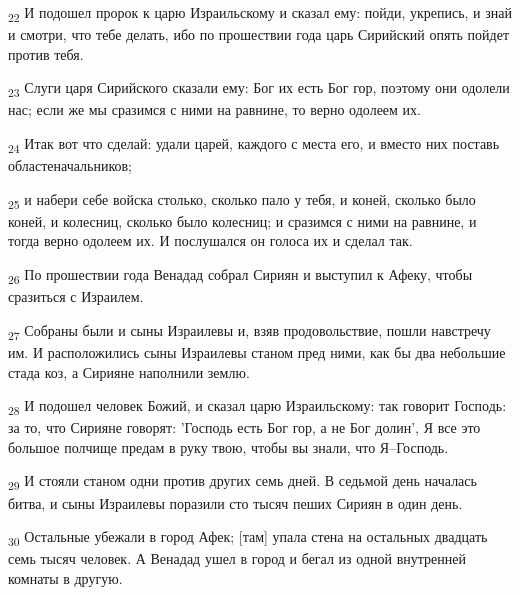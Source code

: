 \begin{tcolorbox}
\textsubscript{22} И подошел пророк к царю Израильскому и сказал ему: пойди, укрепись, и знай и смотри, что тебе делать, ибо по прошествии года царь Сирийский опять пойдет против тебя.
\end{tcolorbox}
\begin{tcolorbox}
\textsubscript{23} Слуги царя Сирийского сказали ему: Бог их есть Бог гор, поэтому они одолели нас; если же мы сразимся с ними на равнине, то верно одолеем их.
\end{tcolorbox}
\begin{tcolorbox}
\textsubscript{24} Итак вот что сделай: удали царей, каждого с места его, и вместо них поставь областеначальников;
\end{tcolorbox}
\begin{tcolorbox}
\textsubscript{25} и набери себе войска столько, сколько пало у тебя, и коней, сколько было коней, и колесниц, сколько было колесниц; и сразимся с ними на равнине, и тогда верно одолеем их. И послушался он голоса их и сделал так.
\end{tcolorbox}
\begin{tcolorbox}
\textsubscript{26} По прошествии года Венадад собрал Сириян и выступил к Афеку, чтобы сразиться с Израилем.
\end{tcolorbox}
\begin{tcolorbox}
\textsubscript{27} Собраны были и сыны Израилевы и, взяв продовольствие, пошли навстречу им. И расположились сыны Израилевы станом пред ними, как бы два небольшие стада коз, а Сирияне наполнили землю.
\end{tcolorbox}
\begin{tcolorbox}
\textsubscript{28} И подошел человек Божий, и сказал царю Израильскому: так говорит Господь: за то, что Сирияне говорят: 'Господь есть Бог гор, а не Бог долин', Я все это большое полчище предам в руку твою, чтобы вы знали, что Я--Господь.
\end{tcolorbox}
\begin{tcolorbox}
\textsubscript{29} И стояли станом одни против других семь дней. В седьмой день началась битва, и сыны Израилевы поразили сто тысяч пеших Сириян в один день.
\end{tcolorbox}
\begin{tcolorbox}
\textsubscript{30} Остальные убежали в город Афек; [там] упала стена на остальных двадцать семь тысяч человек. А Венадад ушел в город и бегал из одной внутренней комнаты в другую.
\end{tcolorbox}
